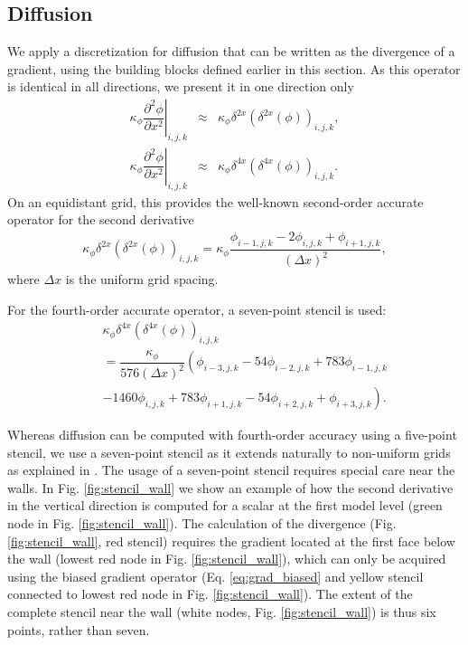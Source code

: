 \documentclass[gmd,manuscript]{copernicus}
\begin{document}
\subsection{Diffusion}
We apply a discretization for diffusion that can be written as the divergence of a gradient, using the building blocks defined earlier in this section. As this operator is identical in all directions, we present it in one direction only
\begin{eqnarray}
\left. \kappa_\phi \dfrac{\partial^2 \phi}{\partial x^2}\right|_{i,j,k} & \approx &
\kappa_\phi \delta^{2x} \left( \delta^{2x} \left( \phi \right) \right)_{i,j,k},\\
\left. \kappa_\phi \dfrac{\partial^2 \phi}{\partial x^2}\right|_{i,j,k} & \approx &
\kappa_\phi \delta^{4x} \left( \delta^{4x} \left( \phi \right) \right)_{i,j,k}.
\end{eqnarray}
On an equidistant grid, this provides the well-known second-order accurate operator for the second derivative
\begin{eqnarray}
\kappa_\phi \delta^{2x} \left( \delta^{2x} \left( \phi \right) \right)_{i,j,k} =
\kappa_\phi \dfrac{ \phi_{i-1,j,k} - 2 \phi_{i,j,k} + \phi_{i+1,j,k} }{\left( \Delta x \right)^2},\label{eq:diff_2nd}
\end{eqnarray}
where $\Delta x$ is the uniform grid spacing.

For the fourth-order accurate operator, a seven-point stencil is used:
\begin{eqnarray}
\nonumber
&& \kappa_\phi \delta^{4x} \left( \delta^{4x} \left( \phi \right) \right)_{i,j,k}\\
\nonumber
&& = \dfrac{\kappa_\phi}{576 \left( \Delta x \right)^2} \left( \phi_{i-3,j,k} - 54 \phi_{i-2,j,k} + 783 \phi_{i-1,j,k}\right.\\
&&  \left. - 1460  \phi_{i,j,k} + 783 \phi_{i+1,j,k} - 54 \phi_{i+2,j,k} + \phi_{i+3,j,k} \right). \label{eq:diff_4th}
\end{eqnarray}

Whereas diffusion can be computed with fourth-order accuracy using a five-point stencil, we use a seven-point stencil as it extends naturally to non-uniform grids as explained in \citet{Castillo1995}. The usage of a seven-point stencil requires special care near the walls. In Fig. \ref{fig:stencil_wall} we show an example of how the second derivative in the vertical direction is computed for a scalar at the first model level (green node in Fig. \ref{fig:stencil_wall}). The calculation of the divergence (Fig. \ref{fig:stencil_wall}, red stencil) requires the gradient located at the first face below the wall (lowest red node in Fig. \ref{fig:stencil_wall}), which can only be acquired using the biased gradient operator (Eq. \ref{eq:grad_biased} and yellow stencil connected to lowest red node in Fig. \ref{fig:stencil_wall}). The extent of the complete stencil near the wall (white nodes, Fig. \ref{fig:stencil_wall}) is thus six points, rather than seven.
\end{document}
